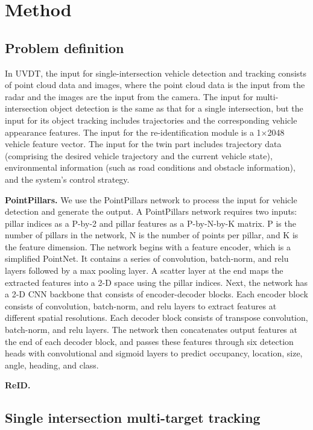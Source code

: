 \section{Method}

\subsection{Problem definition}

In UVDT, the input for single-intersection vehicle detection and tracking consists of point cloud data and images, where the point cloud data is the input from the radar and the images are the input from the camera. 
The input for multi-intersection object detection is the same as that for a single intersection, but the input for its object tracking includes trajectories and the corresponding vehicle appearance features. 
The input for the re-identification module is a 1×2048 vehicle feature vector. 
The input for the twin part includes trajectory data (comprising the desired vehicle trajectory and the current vehicle state), environmental information (such as road conditions and obstacle information), and the system's control strategy.

\textbf{PointPillars.}
We use the PointPillars network to process the input for vehicle detection and generate the output.
A PointPillars network requires two inputs: pillar indices as a P-by-2 and pillar features as a P-by-N-by-K matrix. P is the number of pillars in the network, N is the number of points per pillar, and K is the feature dimension.
The network begins with a feature encoder, which is a simplified PointNet. It contains a series of convolution, batch-norm, and relu layers followed by a max pooling layer. A scatter layer at the end maps the extracted features into a 2-D space using the pillar indices.
Next, the network has a 2-D CNN backbone that consists of encoder-decoder blocks. Each encoder block consists of convolution, batch-norm, and relu layers to extract features at different spatial resolutions. Each decoder block consists of transpose convolution, batch-norm, and relu layers.
The network then concatenates output features at the end of each decoder block, and passes these features through six detection heads with convolutional and sigmoid layers to predict occupancy, location, size, angle, heading, and class.

\textbf{ReID.}

\subsection{Single intersection multi-target tracking}

